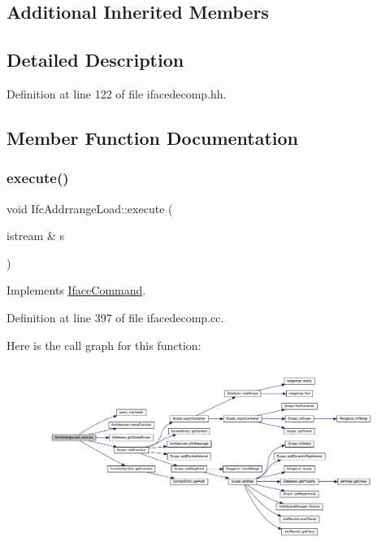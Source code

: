 \subsection*{Additional Inherited Members}


\subsection{Detailed Description}


Definition at line 122 of file ifacedecomp.\+hh.



\subsection{Member Function Documentation}
\mbox{\label{class_ifc_addrrange_load_ae9d83583bd9d087d4b821dd3055968d0}} 
\subsubsection{\texorpdfstring{execute()}{execute()}}
{\footnotesize\ttfamily void Ifc\+Addrrange\+Load\+::execute (\begin{DoxyParamCaption}\item[{istream \&}]{s }\end{DoxyParamCaption})\hspace{0.3cm}{\ttfamily [virtual]}}



Implements \mbox{\hyperlink{class_iface_command_af10e29cee2c8e419de6efe9e680ad201}{Iface\+Command}}.



Definition at line 397 of file ifacedecomp.\+cc.

Here is the call graph for this function\+:
\nopagebreak
\begin{figure}[H]
\begin{center}
\leavevmode
\includegraphics[width=350pt]{class_ifc_addrrange_load_ae9d83583bd9d087d4b821dd3055968d0_cgraph}
\end{center}
\end{figure}


